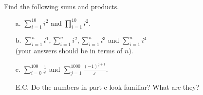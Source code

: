 {Find the following sums and products.
\begin{enumerate}
\item[a.] $\displaystyle \sum_{i=1}^{10} i^2$ and $\displaystyle\prod_{i=1}^{10} i^2$.
\item[b.] $\displaystyle \sum_{i=1}^{n} i^1,\sum_{i=1}^{n} i^2, \sum_{i=1}^{n} i^3$ and $\displaystyle\sum_{i=1}^{n} i^4$\\  
(your answers should be in terms of $n$).
\item[c.] $\displaystyle \sum_{i=0}^{100} \frac{1}{i!}$ and $\displaystyle \sum_{j=1}^{1000} \frac{(-1)^{j+1}}{j}$.  
\item[E.C.] Do the numbers in part c look familiar?  What are they?
\end{enumerate}}
{}